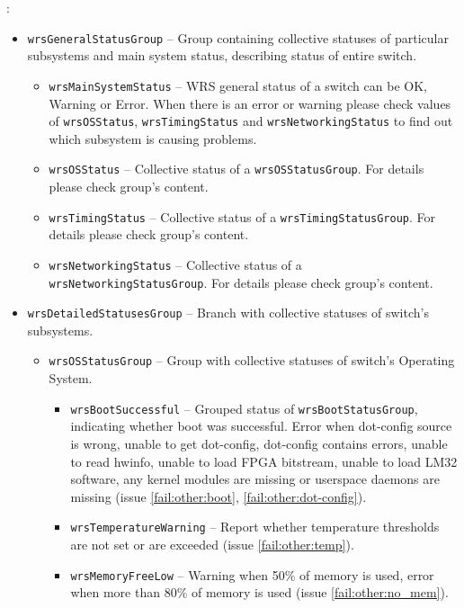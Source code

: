 :
\begin{itemize}%
  \item \texttt{wrsGeneralStatusGroup} -- Group containing collective statuses
	of particular subsystems and main system status, describing status of
	entire switch.
    \begin{itemize}
      \item \texttt{wrsMainSystemStatus} -- WRS general status of a switch can
	    be OK, Warning or Error. When there is an error or warning please
	    check values of \texttt{wrsOSStatus}, \texttt{wrsTimingStatus}
	    and \texttt{wrsNetworkingStatus} to find out which subsystem is
	    causing problems.
      \item \texttt{wrsOSStatus} -- Collective status of a
	    \texttt{wrsOSStatusGroup}. For details please check group's content.
      \item \texttt{wrsTimingStatus} -- Collective status of a
	    \texttt{wrsTimingStatusGroup}. For details please check group's
	    content.
      \item \texttt{wrsNetworkingStatus} -- Collective status of a
	    \texttt{wrsNetworkingStatusGroup}. For details please check group's
	    content.
    \end{itemize}
  \item \texttt{wrsDetailedStatusesGroup} -- Branch with collective statuses of
	switch's subsystems.
    \begin{itemize}
      \item \texttt{wrsOSStatusGroup} -- Group with collective statuses of
	switch's Operating System.
	\begin{itemize}
	  \item \texttt{wrsBootSuccessful} -- Grouped status of
		\texttt{wrsBootStatusGroup}, indicating whether boot was
		successful. Error when dot-config source is wrong, unable to
		get dot-config, dot-config contains errors, unable to read
		hwinfo, unable to load FPGA bitstream, unable to load LM32
		software, any kernel modules are missing or userspace daemons
		are missing (issue \ref{fail:other:boot},
		\ref{fail:other:dot-config}).
	  \item \texttt{wrsTemperatureWarning} -- Report whether temperature
		thresholds are not set or are exceeded (issue
		\ref{fail:other:temp}).
	  \item \texttt{wrsMemoryFreeLow} -- Warning when 50\% of memory is
		used, error when more than 80\% of memory is used (issue
		\ref{fail:other:no_mem}).

\end{itemize}
\end{itemize}
\end{itemize}
